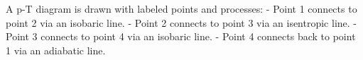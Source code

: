 A p-T diagram is drawn with labeled points and processes:  
- Point 1 connects to point 2 via an isobaric line.  
- Point 2 connects to point 3 via an isentropic line.  
- Point 3 connects to point 4 via an isobaric line.  
- Point 4 connects back to point 1 via an adiabatic line.